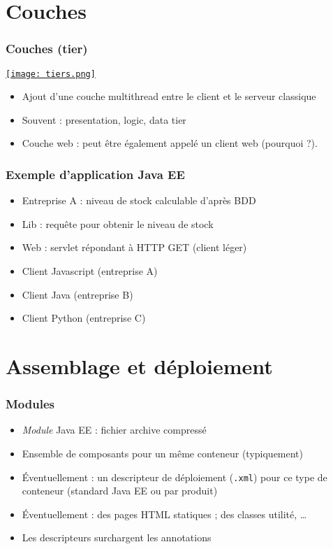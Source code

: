 \documentclass[english, french]{beamer}
\begin{document}
\section{Couches}
\begin{frame}
	\frametitle{Couches (\og{}tier\fg{})}
	\begin{minipage}{\columnwidth*\real{0.6}}
		\href{https://docs.oracle.com/javaee/7/tutorial/overview003.htm}{\texttt{[image: tiers.png]}}
	\end{minipage}%
	\begin{minipage}{\columnwidth*\real{0.4}}
		\begin{itemize}
			\item Ajout d’une couche multithread entre le client et le serveur classique
			\item Souvent : presentation, logic, data tier
			\item Couche web : peut être également appelé un client web (pourquoi ?).
		\end{itemize}
	\end{minipage}
\end{frame}

\begin{frame}
	\frametitle{Exemple d’application Java EE}
	\begin{itemize}
		\item Entreprise A : niveau de stock calculable d’après BDD
		\item Lib : requête pour obtenir le niveau de stock
		\item Web : servlet répondant à HTTP GET (client léger)
		\item Client Javascript (entreprise A)
		\item Client Java (entreprise B)
		\item Client Python (entreprise C)
	\end{itemize}		
\end{frame}

\section{Assemblage et déploiement}
\begin{frame}
	\frametitle{Modules}
	\begin{itemize}
		\item \emph{Module} Java EE : fichier archive compressé
		\item Ensemble de composants pour un même conteneur {\tiny (typiquement)}
		\item Éventuellement : un descripteur de déploiement (\texttt{.xml}) pour ce type de conteneur (standard Java EE ou par produit)
		\item Éventuellement :  des pages HTML statiques ; des classes utilité, …
		\item Les descripteurs surchargent les annotations
	\end{itemize}
\end{frame}
\end{document}
